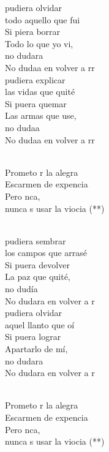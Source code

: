 \documentclass[12pt]{article}
\begin{document}
\begin{multicols*}{2}
\begin{cancion}%
	pudiera olvidar \\
todo aquello que fui\\
	Si piera borrar\\
Todo lo que yo vi, \\
	no dudara\\
	No dudaa en volver a rr \\
\jump
	pudiera explicar\\
las vidas que quité\\
	Si puera quemar\\
Las armas que use, \\
	no dudaa \\
	No dudaa en volver a rr \\\jump\\
	\begin{chorus}%
	Prometo r la alegra\\
	Escarmen de  expencia\\
	Pero nca,\\
	nunca s usar la viocia (**) \\
	\end{chorus}%
	\jump\\
	pudiera sembrar \\
los campos que arrasé\\
	Si puera devolver\\
La paz que quité, \\
	no dudía\\
	No dudara en volver a r \\
\jump
	pudiera olvidar \\
aquel llanto que oí\\
	Si puera lograr\\
Apartarlo de mí, \\
	no dudara\\
	No dudara en volver a r \\\jump\\
	\begin{chorus}%
	Prometo r la alegra\\
	Escarmen de  expencia\\
	Pero nca,\\
	nunca s usar la viocia (**) \\
	\end{chorus}%
	\jump\\
\end{cancion}%


\end{multicols*}
\end{document}
